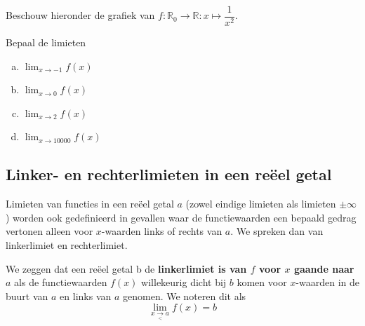 \documentclass[12pt,twoside,a4paper]{article}
\newenvironment{definitie}
{
  \vspace{0.4cm}
  \begin{mdframed}[nobreak=true,frametitle={Definitie}]
  }{%
  \end{mdframed}
}
\begin{document}
\begin{oefening}
  Beschouw hieronder de grafiek van $f:\mathbb{R}_0\to\mathbb{R}:x\mapsto\dfrac{1}{x^2}$.
  \begin{center}
  \end{center}
  Bepaal de limieten
  \begin{multicols}{2}
  \begin{enumerate}[(a)]
  \itemsep.5em
  \item $\displaystyle\lim_{x\to-1} f(x)$
  \item $\displaystyle\lim_{x\to0} f(x)$
  \item $\displaystyle\lim_{x\to2} f(x)$
  \item $\displaystyle\lim_{x\to10000} f(x)$
  \end{enumerate}
  \end{multicols}
\end{oefening}

\subsection{Linker- en rechterlimieten in een reëel getal}

Limieten van functies in een reëel getal $a$ (zowel eindige limieten als limieten $\pm\infty$) worden ook gedefinieerd in gevallen waar de functiewaarden een bepaald gedrag vertonen alleen voor $x$-waarden links of rechts van $a$. We spreken dan van linkerlimiet en rechterlimiet.

\begin{definitie}
  We zeggen dat een reëel getal b de {\bf linkerlimiet is van $f$ voor $x$ gaande naar $a$} als de functiewaarden $f(x)$ willekeurig dicht bij $b$ komen voor $x$-waarden in de buurt van $a$ en links van $a$ genomen. We noteren dit als
  $$\lim_{x\underset{<}{\to}a}f(x)=b$$
\end{definitie}
\end{document}
